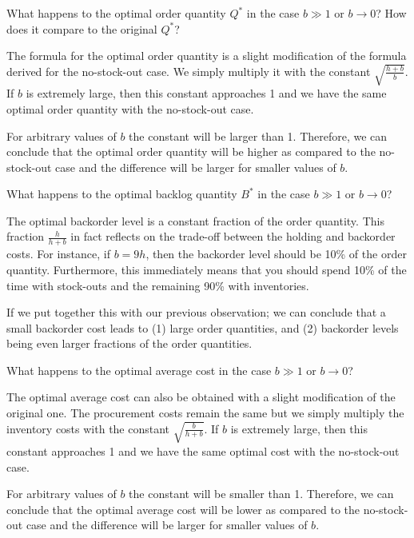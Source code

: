 \begin{exercise}
What happens to the optimal order quantity $Q^*$ in the case $b\gg 1$ or $b \to 0$? How does it compare to the original $Q^*$?

\begin{solution}

 The formula for the optimal order quantity is a slight modification of the formula derived for the no-stock-out case. We simply multiply it with the constant $\sqrt{\frac{h+b}{b}}$. If $b$ is extremely large, then this constant approaches 1 and we have the same optimal order quantity with the no-stock-out case. 

For arbitrary values of $b$ the constant will be larger than 1. Therefore, we can conclude that the optimal order quantity will be higher as compared to the no-stock-out case and the difference will be larger for smaller values of $b$. 
\end{solution}
\end{exercise}


\begin{exercise}
What happens to the optimal backlog quantity $B^*$ in the case $b\gg 1$ or $b \to 0$? 
\begin{solution}
 The optimal backorder level is a constant fraction of the order quantity. This fraction $\frac{h}{h+b}$ in fact reflects on the trade-off between the holding and backorder costs. For instance, if $b=9h$, then the backorder level should be 10\% of the order quantity. Furthermore, this immediately means that you should spend 10\% of the time with stock-outs and the remaining 90\% with inventories. 

If we put together this with our previous observation; we can conclude that a small backorder cost leads to (1) large order quantities, and (2) backorder levels being even larger fractions of the order quantities. 
\end{solution}
\end{exercise}


\begin{exercise}
What happens to the optimal average cost in the case $b\gg 1$ or $b \to 0$? 
\begin{solution}
The optimal average cost can also be obtained with a slight modification of the original one. The procurement costs remain the same but we simply multiply the inventory costs with the constant $\sqrt{\frac{b}{h+b}}$. If $b$ is extremely large, then this constant approaches 1 and we have the same optimal cost with the no-stock-out case. 

For arbitrary values of $b$ the constant will be smaller than 1. Therefore, we can conclude that the optimal average cost will be lower as compared to the no-stock-out case and the difference will be larger for smaller values of $b$. 
\end{solution}
\end{exercise}


